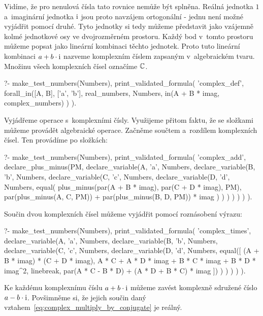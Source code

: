 Vidíme, že pro nenulová čísla tato rovnice nemůže být splněna. Reálná jednotka \(1\) a~imaginární jednotka \(\mathrm{i}\) jsou proto navzájem ortogonální - jednu není možné vyjádřit pomocí druhé. Tyto jednotky si tedy můžeme představit jako vzájemně kolmé jednotkové osy ve dvojrozměrném prostoru. Každý bod v~tomto prostoru můžeme popsat jako lineární kombinaci těchto jednotek. Proto tuto lineární kombinaci \(a + b \cdot \mathrm{i}\) nazveme komplexním číslem zapsaným v~algebraickém tvaru. Množinu všech komplexních čísel označíme \(\mathbb{C}\).

\begin{fact}
\begin{prolog}
?-	make_test_numbers(Numbers),
	print_validated_formula(
		'complex_def',
		forall_in([A, B], ['a', 'b'], real_numbers, Numbers,
			in(A + B * imag, complex_numbers)
		)
	).
\end{prolog}
\end{fact}

Vyjádřeme operace s~komplexními čísly. Využijeme přitom faktu, že se složkami můžeme provádět algebraické operace. Začněme součtem a~rozdílem komplexních čísel. Ten provádíme po složkách:

\begin{prolog}
?-	make_test_numbers(Numbers),
	print_validated_formula(
		'complex_add',
		declare_plus_minus(PM,
			declare_variable(A, 'a', Numbers,
				declare_variable(B, 'b', Numbers,
					declare_variable(C, 'c', Numbers,
						declare_variable(D, 'd', Numbers,
							equal(
								plus_minus(par(A + B * imag), par(C + D * imag), PM),
								par(plus_minus(A, C, PM)) + par(plus_minus(B, D, PM)) * imag
							)
						)
					)
				)
			)
		)
	).
\end{prolog}

Součin dvou komplexních čísel můžeme vyjádřit pomocí roznásobení výrazu:

\begin{prolog}
?-	make_test_numbers(Numbers),
	print_validated_formula(
		'complex_times',
		declare_variable(A, 'a', Numbers,
			declare_variable(B, 'b', Numbers,
				declare_variable(C, 'c', Numbers,
					declare_variable(D, 'd', Numbers,
						equal([
							(A + B * imag) * (C + D * imag),
							A * C + A * D * imag + B * C * imag + B * D * imag^2,
							linebreak,
							par(A * C - B * D) + (A * D  + B * C) * imag
						])
					)
				)
			)
		)
	).
\end{prolog}

Ke každému komplexnímu číslu \(a + b \cdot \mathrm{i}\) můžeme zavést komplexně sdružené číslo \(a - b \cdot \mathrm{i}\). Povšimněme si, že jejich součin daný vztahem~\eqref{eq:complex_multiply_by_conjugate} je reálný.

